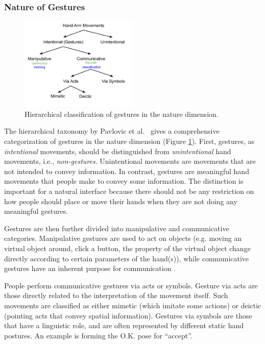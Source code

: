 \subsubsection{Nature of Gestures}
\begin{figure}[tbh]
  \centering
  \includegraphics[width=0.5\textwidth]{figures/taxonomy.png} 
  \caption{Hierarchical classification of gestures in the nature dimension.}
  \label{fig:taxonomy}
\end{figure}

The hierarchical taxonomy by Pavlovic et al.~\cite{Pavlovic97} gives
a comprehensive categorization of gestures in the nature dimension (Figure
\ref{fig:taxonomy}).
First, gestures, as \textit{intentional} movements, should be distinguished from \textit{unintentional} hand movements, i.e., \textit{non-gestures}.
Unintentional movements are movements that are not intended to convey
information. In contrast, gestures are meaningful hand movements that people make to convey some
information. The distinction is important for a natural interface because there
should not be any restriction on how people should place or move their hands
when they are not doing any meaningful gestures.  


Gestures are then further divided into manipulative and communicative
categories. Manipulative gestures are used to act on objects (e.g.
moving an virtual object around, click a button, the property of the virtual
object change directly according to certain parameters of the hand(s)), while
communicative gestures have an inherent purpose for communication \cite{Pavlovic97}. 

People perform communicative gestures via acts or symbols. Gesture via acts are
those directly related to the interpretation of the movement itself. Such
movements are classified as either mimetic (which imitate some actions) or
deictic (pointing acts that convey spatial information). Gestures via symbols
are those that have a linguistic role, and are often represented by different static hand postures. An example is forming the
O.K. pose for ``accept''. 

